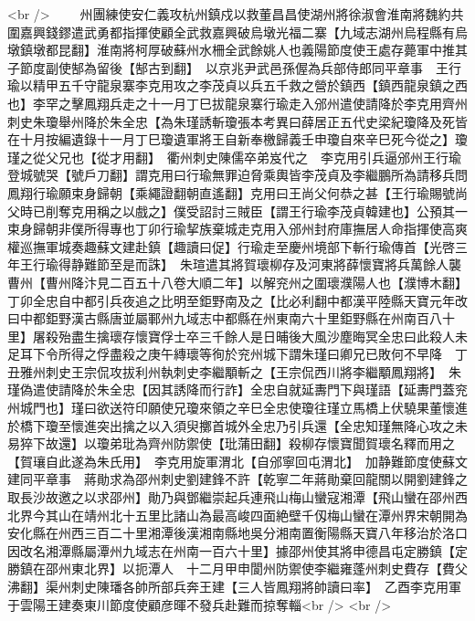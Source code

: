<br />
　　州團練使安仁義攻杭州鎮戍以救董昌昌使湖州將徐淑會淮南將魏約共圍嘉興錢鏐遣武勇都指揮使顧全武救嘉興破烏墩光福二寨【九域志湖州烏程縣有烏墩鎮墩都昆翻】淮南將柯厚破蘇州水柵全武餘姚人也義陽節度使王處存薨軍中推其子節度副使郜為留後【郜古到翻】　以京兆尹武邑孫偓為兵部侍郎同平章事　王行瑜以精甲五千守龍泉寨李克用攻之李茂貞以兵五千救之營於鎮西【鎮西龍泉鎮之西也】李罕之擊鳳翔兵走之十一月丁巳拔龍泉寨行瑜走入邠州遣使請降於李克用齊州刺史朱瓊舉州降於朱全忠【為朱瑾誘斬瓊張本考異曰薛居正五代史梁紀瓊降及死皆在十月按編遺錄十一月丁巳瓊遺軍將王自新奉檄歸義壬申瓊自來辛巳死今從之】瓊瑾之從父兄也【從才用翻】　衢州刺史陳儒卒弟岌代之　李克用引兵逼邠州王行瑜登城號哭【號戶刀翻】謂克用曰行瑜無罪迫脅乘輿皆李茂貞及李繼鵬所為請移兵問鳳翔行瑜願束身歸朝【乘繩證翻朝直遙翻】克用曰王尚父何恭之甚【王行瑜賜號尚父時已削奪克用稱之以戲之】僕受詔討三賊臣【謂王行瑜李茂貞韓建也】公預其一束身歸朝非僕所得專也丁卯行瑜挈族棄城走克用入邠州封府庫撫居人命指揮使高爽權巡撫軍城奏趣蘇文建赴鎮【趣讀曰促】行瑜走至慶州境部下斬行瑜傳首【光啓三年王行瑜得静難節至是而誅】　朱瑄遣其將賀瓌柳存及河東將薛懷寶將兵萬餘人襲曹州【曹州降汴見二百五十八卷大順二年】以解兖州之圍瓌濮陽人也【濮博木翻】丁卯全忠自中都引兵夜追之比明至鉅野南及之【比必利翻中都漢平陸縣天寶元年改曰中都鉅野漢古縣唐並屬鄆州九域志中都縣在州東南六十里鉅野縣在州南百八十里】屠殺殆盡生擒瓌存懷寶俘士卒三千餘人是日晡後大風沙塵晦冥全忠曰此殺人未足耳下令所得之俘盡殺之庚午縳瓌等徇於兖州城下謂朱瑾曰卿兄已敗何不早降　丁丑雅州刺史王宗侃攻拔利州執刺史李繼顒斬之【王宗侃西川將李繼顒鳳翔將】　朱瑾偽遣使請降於朱全忠【因其誘降而行詐】全忠自就延夀門下與瑾語【延夀門蓋兖州城門也】瑾曰欲送符印願使兄瓊來領之辛巳全忠使瓊往瑾立馬橋上伏驍果董懷進於橋下瓊至懷進突出擒之以入須臾擲首城外全忠乃引兵還【全忠知瑾無降心攻之未易猝下故還】以瓊弟玭為齊州防禦使【玭蒲田翻】殺柳存懷寶聞賀瓌名釋而用之【賀瓖自此遂為朱氏用】　李克用旋軍渭北【自邠寧回屯渭北】　加静難節度使蘇文建同平章事　蔣勛求為邵州刺史劉建鋒不許【乾寧二年蔣勛棄回龍關以開劉建鋒之取長沙故邀之以求邵州】勛乃與鄧繼崇起兵連飛山梅山蠻寇湘潭【飛山蠻在邵州西北界今其山在靖州北十五里比諸山為最高峻四面絶壁千仭梅山蠻在潭州界宋朝開為安化縣在州西三百二十里湘潭後漢湘南縣地吳分湘南置衡陽縣天寶八年移治於洛口因改名湘潭縣屬潭州九域志在州南一百六十里】據邵州使其將申德昌屯定勝鎮【定勝鎮在邵州東北界】以扼潭人　十二月甲申閬州防禦使李繼雍蓬州刺史費存【費父沸翻】渠州刺史陳璠各帥所部兵奔王建【三人皆鳳翔將帥讀曰率】　乙酉李克用軍于雲陽王建奏東川節度使顧彦暉不發兵赴難而掠奪輜<br />
<br />
